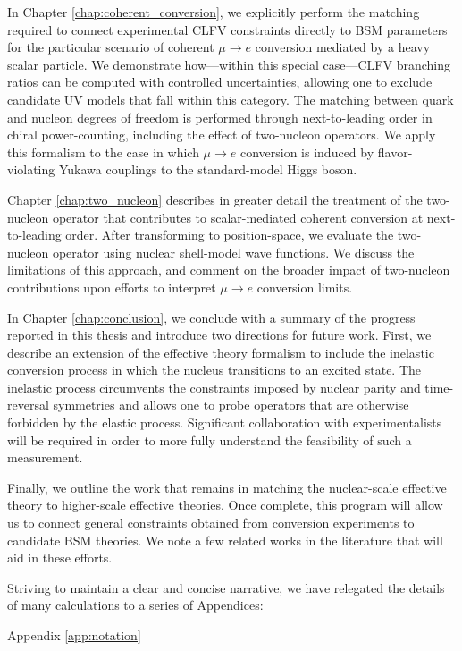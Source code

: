 \documentclass[12pt,letterpaper]{book}
\begin{document}
In Chapter \ref{chap:coherent_conversion}, we explicitly perform the matching required to connect experimental CLFV constraints directly to BSM parameters for the particular scenario of coherent $\mu\rightarrow e$ conversion mediated by a heavy scalar particle. We demonstrate how---within this special case---CLFV branching ratios can be computed with controlled uncertainties, allowing one to exclude candidate UV models that fall within this category. The matching between quark and nucleon degrees of freedom is performed through next-to-leading order in chiral power-counting, including the effect of two-nucleon operators. We apply this formalism to the case in which $\mu\rightarrow e$ conversion is induced by flavor-violating Yukawa couplings to the standard-model Higgs boson.

Chapter \ref{chap:two_nucleon} describes in greater detail the treatment of the two-nucleon operator that contributes to scalar-mediated coherent conversion at next-to-leading order. After transforming to position-space, we evaluate the two-nucleon operator using nuclear shell-model wave functions. We discuss the limitations of this approach, and comment on the broader impact of two-nucleon contributions upon efforts to interpret $\mu\rightarrow e$ conversion limits.

In Chapter \ref{chap:conclusion}, we conclude with a summary of the progress reported in this thesis and introduce two directions for future work. First, we describe an extension of the effective theory formalism to include the inelastic conversion process in which the nucleus transitions to an excited state. The inelastic process circumvents the constraints imposed by nuclear parity and time-reversal symmetries and allows one to probe operators that are otherwise forbidden by the elastic process. Significant collaboration with experimentalists will be required in order to more fully understand the feasibility of such a measurement.

Finally, we outline the work that remains in matching the nuclear-scale effective theory to higher-scale effective theories. Once complete, this program will allow us to connect general constraints obtained from conversion experiments to candidate BSM theories. We note a few related works in the literature that will aid in these efforts.

Striving to maintain a clear and concise narrative, we have relegated the details of many calculations to a series of Appendices:

Appendix \ref{app:notation}
\end{document}

